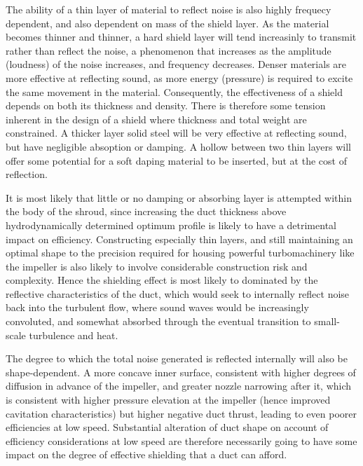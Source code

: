 \documentclass{article}\usepackage[]{graphicx}\usepackage[]{color}
\begin{document}
The ability of a thin layer of material to reflect noise is also highly frequecy dependent, and also dependent on mass of the shield layer.  As the material becomes thinner and thinner, a hard shield layer will tend increasinly to transmit rather than reflect the noise, a phenomenon that increases as the amplitude (loudness) of the noise increases, and frequency decreases.  Denser materials are more effective at reflecting sound, as more energy (pressure) is required to excite the same movement in the material.  Consequently, the effectiveness of a shield depends on both its thickness and density.  There is therefore some tension inherent in the design of a shield where thickness and total weight are constrained.  A thicker layer solid steel will be very effective at reflecting sound, but have negligible absoption or damping.  A hollow between two thin layers will offer some potential for a soft daping material to be inserted, but at the cost of reflection.

It is most likely that little or no damping or absorbing layer is attempted within the body of the shroud, since increasing the duct thickness above hydrodynamically determined optimum profile is likely to have a detrimental impact on efficiency.  Constructing especially thin layers, and still maintaining an optimal shape to the precision required for housing powerful turbomachinery like the impeller is also likely to involve considerable construction risk and complexity.  Hence the shielding effect is most likely to dominated by the reflective characteristics of the duct, which would seek to internally reflect noise back into the turbulent flow, where sound waves would be increasingly convoluted, and somewhat absorbed through the eventual transition to small-scale turbulence and heat.

The degree to which the total noise generated is reflected internally will also be shape-dependent.  A more concave inner surface, consistent with higher degrees of diffusion in advance of the impeller, and greater nozzle narrowing after it, which is consistent with higher pressure elevation at the impeller (hence improved cavitation characteristics) but higher negative duct thrust, leading to even poorer efficiencies at low speed.  Substantial alteration of duct shape on account of efficiency considerations at low speed are therefore necessarily going to have some impact on the degree of effective shielding that a duct can afford.
\end{document}
